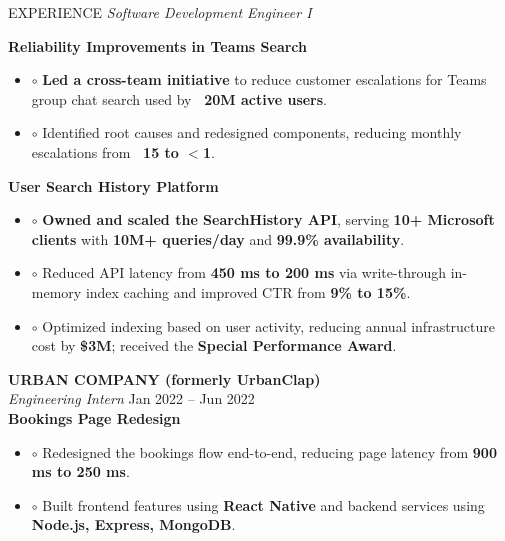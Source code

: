 \documentclass[10pt]{resume}
\begin{document}
\begin{rSection}{EXPERIENCE}
\textit{Software Development Engineer I}

\textbf{Reliability Improvements in Teams Search}
\begin{itemize}
\item[] $\circ$ \textbf{Led a cross-team initiative} to reduce customer escalations for Teams group chat search used by \textbf{~20M active users}.
\item[] $\circ$ Identified root causes and redesigned components, reducing monthly escalations from \textbf{~15 to $<$1}.
\end{itemize}

\textbf{User Search History Platform}
\begin{itemize}
\item[] $\circ$ \textbf{Owned and scaled the SearchHistory API}, serving \textbf{10+ Microsoft clients} with \textbf{10M+ queries/day} and \textbf{99.9\% availability}.
\item[] $\circ$ Reduced API latency from \textbf{450 ms to 200 ms} via write-through in-memory index caching and improved CTR from \textbf{9\% to 15\%}.
\item[] $\circ$ Optimized indexing based on user activity, reducing annual infrastructure cost by \textbf{\$3M}; received the \textbf{Special Performance Award}.
\end{itemize}

\vspace{4pt}
\textbf{URBAN COMPANY (formerly UrbanClap)} \\
\textit{Engineering Intern} \hfill Jan 2022 -- Jun 2022 \\[1pt]
\textbf{Bookings Page Redesign}
\begin{itemize}
\item[] $\circ$ Redesigned the bookings flow end-to-end, reducing page latency from \textbf{900 ms to 250 ms}.
\item[] $\circ$ Built frontend features using \textbf{React Native} and backend services using \textbf{Node.js, Express, MongoDB}.
\end{itemize}



\end{rSection}
\end{document}
